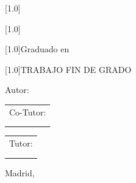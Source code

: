 \begin{titlepage}
\begin{center}
    \vspace*{0.1cm}

    \scalebox{.7}[1.0]{\huge{\MakeUppercase{\Universidad}}} \vspace*{1cm}

    \scalebox{.7}[1.0]{\huge{\MakeUppercase{\Centro}}} \vspace*{0.8cm}
    
    \scalebox{.7}[1.0]{\LARGE{Graduado en \Grado}} \vspace*{0.25cm}

    \scalebox{.7}[1.0]{\Huge{TRABAJO FIN DE GRADO}} \vspace*{2.0cm}

    \LARGE{\textbf{\TituloTFG}} \vspace*{2.0cm}

    \LARGE{Autor: \NombreAutor}

  \end{center}

\endgroup

  \vspace*{2.0cm}

  \begin{minipage}{0.1\linewidth}
    \hspace*{-1.5cm}
    \noindent
    \begin{tabular}{l}
      Co-Tutor: \\
      \NombreCoTutor{} \\
      \DepartamentoCoTutor{}
    \end{tabular}
  \end{minipage}
  \begin{minipage}{0.4\linewidth}
    \begin{center}
      \qquad
    \end{center}
  \end{minipage}
  \begin{minipage}{0.1\linewidth}
    \noindent
    \begin{tabular}{l}
      Tutor: \\
      \NombreTutor{} \\
      \DepartamentoTutor{}
    \end{tabular}
  \end{minipage}

  \begin{flushright}
    \vspace*{\fill}
    Madrid, \FechaLectura
  \end{flushright}


\end{titlepage}
